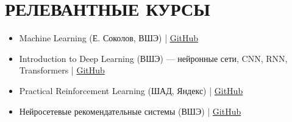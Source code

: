 \documentclass[10pt,a4paper]{article}
\begin{document}
\section{РЕЛЕВАНТНЫЕ КУРСЫ}
\begin{itemize}[left=0pt, itemsep=1pt]
    \item Machine Learning (Е. Соколов, ВШЭ) | \href{https://github.com/esokolov/ml-course-hse}{GitHub}
    \item Introduction to Deep Learning (ВШЭ) — нейронные сети, CNN, RNN, Transformers | \href{https://github.com/xiyori/intro-to-dl-hse}{GitHub}
    \item Practical Reinforcement Learning (ШАД, Яндекс) | \href{https://github.com/yandexdataschool/Practical_RL}{GitHub}
    \item Нейросетевые рекомендательные системы (ВШЭ) | \href{https://github.com/KhrylchenkoKirill/DeepRecSys}{GitHub}
\end{itemize}
\end{document}
